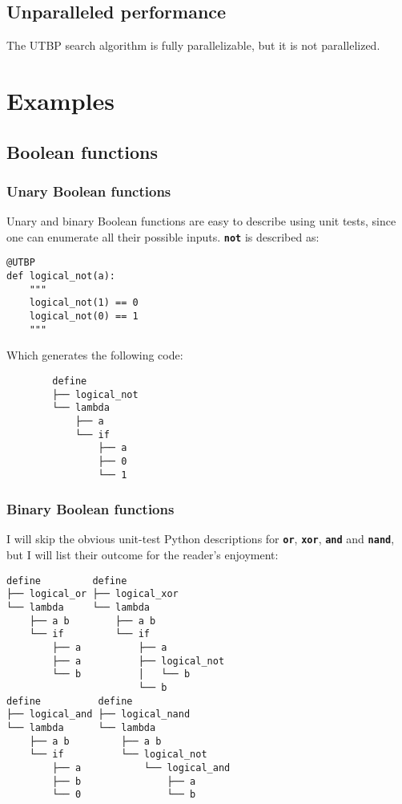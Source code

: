 \documentclass[12pt,twocolumn]{article}
\begin{document}
\subsection{Unparalleled performance}
The UTBP search algorithm is fully parallelizable, but it is not parallelized.

\section{Examples}
\subsection{Boolean functions}
\subsubsection{Unary Boolean functions}
Unary and binary Boolean functions are easy to describe using unit tests, since one can enumerate all their possible inputs. \texttt{\textbf{not}} is described as:

\begin{verbatim}
@UTBP
def logical_not(a):
    """
    logical_not(1) == 0
    logical_not(0) == 1
    """
\end{verbatim}

Which generates the following code:

\begin{verbatim}
        define
        ├── logical_not
        └── lambda
            ├── a
            └── if
                ├── a
                ├── 0
                └── 1
\end{verbatim}

\subsubsection{Binary Boolean functions}
I will skip the obvious unit-test Python descriptions for \texttt{\textbf{or}}, \texttt{\textbf{xor}}, \texttt{\textbf{and}} and \texttt{\textbf{nand}}, but I will list their outcome for the reader's enjoyment:

\begin{verbatim}
define         define
├── logical_or ├── logical_xor
└── lambda     └── lambda
    ├── a b        ├── a b
    └── if         └── if
        ├── a          ├── a
        ├── a          ├── logical_not
        └── b          │   └── b
                       └── b          
define          define
├── logical_and ├── logical_nand
└── lambda      └── lambda
    ├── a b         ├── a b
    └── if          └── logical_not
        ├── a           └── logical_and
        ├── b               ├── a
        └── 0               └── b      
\end{verbatim}
\end{document}

